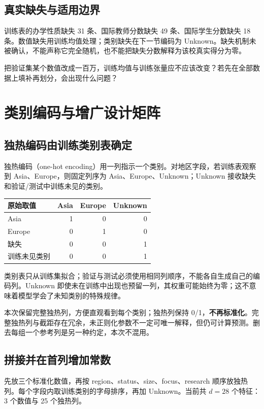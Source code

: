 \documentclass[UTF8,a4paper,11pt,fontset=fandol]{ctexart}
\begin{document}
\subsection{真实缺失与适用边界}
训练表的办学性质缺失 31 条、国际教师分数缺失 49 条、国际学生分数缺失 18 条。数值缺失用训练均值处理；类别缺失在下一节编码为 Unknown。缺失机制未被确认，不能声称它完全随机，也不能把缺失分数解释为该校真实得分为零。
\begin{questionbox}[C2：检查是否泄漏]
把验证集某个数值改成一百万，训练均值与训练张量应不应该改变？若先在全部数据上填补再划分，会出现什么问题？
\end{questionbox}
\clearpage
\section{类别编码与增广设计矩阵}
\subsection{独热编码由训练类别表确定}
独热编码（one-hot encoding）用一列指示一个类别。对地区字段，若训练表观察到 Asia、Europe，则固定列序为 Asia、Europe、Unknown；Unknown 接收缺失和验证/测试中训练未见的类别。
\begin{center}\begin{tabular}{lrrr}\toprule
原始取值 & Asia & Europe & Unknown\\\midrule
Asia & 1 & 0 & 0\\Europe & 0 & 1 & 0\\缺失 & 0 & 0 & 1\\训练未见类别 & 0 & 0 & 1\\\bottomrule\end{tabular}\end{center}
类别表只从训练集拟合；验证与测试必须使用相同列顺序，不能各自生成自己的编码列。Unknown 即使未在训练中出现也预留一列，其权重可能始终为零；这不意味着模型学会了未知类别的特殊规律。

本次保留完整独热列，方便直观看到每个类别；独热列保持 0/1，\textbf{不再标准化}。完整独热列与截距存在冗余，未正则化参数不一定可唯一解释，但仍可计算预测。删去每组一个参考列是另一种约定，本次不混用。
\subsection{拼接并在首列增加常数}
先放三个标准化数值，再按 region、status、size、focus、research 顺序放独热列。每个字段内取训练类别的字母排序，再加 Unknown。当前共 $d=28$ 个特征：3 个数值与 25 个独热列。
\end{document}
